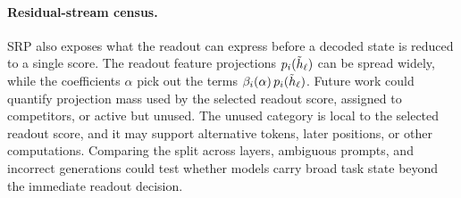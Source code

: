 \paragraph{Residual-stream census.}
SRP also exposes what the readout can express before a decoded state is reduced
to a single score. The readout feature projections \(p_i(\tilde h_\ell)\) can be spread widely,
while the coefficients \(\alpha\) pick out the terms \(\beta_i(\alpha)\,p_i(\tilde h_\ell)\).
Future work could quantify projection mass used by the selected readout score, assigned to
competitors, or active but unused. The unused category is local to the
selected readout score, and it may support alternative tokens, later positions, or other
computations. Comparing the split across layers, ambiguous prompts, and
incorrect generations could test whether models carry broad task state beyond
the immediate readout decision.
